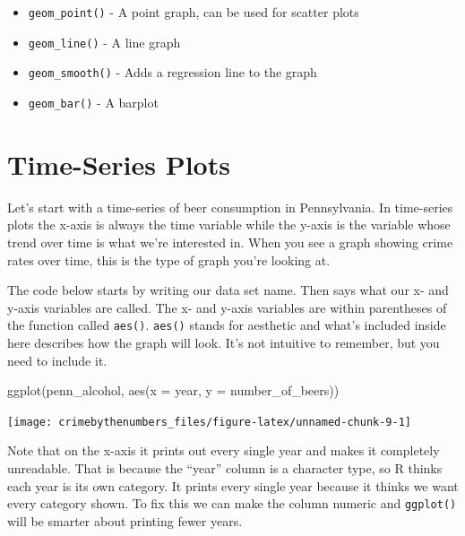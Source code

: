 \documentclass[
]{krantz}
\makeatletter
\newenvironment{Shaded}{\begin{snugshade}}{\end{snugshade}}
\newcommand{\AttributeTok}[1]{\textcolor[rgb]{0.61,0.61,0.61}{#1}}
\newcommand{\FunctionTok}[1]{\textcolor[rgb]{0,0,0}{#1}}
\newcommand{\NormalTok}[1]{#1}
\providecommand{\tightlist}{%
  \setlength{\itemsep}{0pt}\setlength{\parskip}{0pt}}
\newenvironment{kframe}{%
\medskip{}
\setlength{\fboxsep}{.8em}
 \def\at@end@of@kframe{}%
 \ifinner\ifhmode%
  \def\at@end@of@kframe{\end{minipage}}%
  \begin{minipage}{\columnwidth}%
 \fi\fi%
 \def\FrameCommand##1{\hskip\@totalleftmargin \hskip-\fboxsep
 \colorbox{shadecolor}{##1}\hskip-\fboxsep
     \hskip-\linewidth \hskip-\@totalleftmargin \hskip\columnwidth}%
 \MakeFramed {\advance\hsize-\width
   \@totalleftmargin\z@ \linewidth\hsize
   \@setminipage}}%
 {\par\unskip\endMakeFramed%
 \at@end@of@kframe}
\renewenvironment{Shaded}{\begin{kframe}}{\end{kframe}}
\makeatother
\begin{document}
\begin{itemize}
\tightlist
\item
  \texttt{geom\_point()} - A point graph, can be used for scatter plots
\item
  \texttt{geom\_line()} - A line graph
\item
  \texttt{geom\_smooth()} - Adds a regression line to the graph
\item
  \texttt{geom\_bar()} - A barplot
\end{itemize}

\hypertarget{time-series-plots}{%
\section{Time-Series Plots}\label{time-series-plots}}

Let's start with a time-series of beer consumption in Pennsylvania. In time-series plots the x-axis is always the time variable while the y-axis is the variable whose trend over time is what we're interested in. When you see a graph showing crime rates over time, this is the type of graph you're looking at.

The code below starts by writing our data set name. Then says what our x- and y-axis variables are called. The x- and y-axis variables are within parentheses of the function called \texttt{aes()}. \texttt{aes()} stands for aesthetic and what's included inside here describes how the graph will look. It's not intuitive to remember, but you need to include it.

\begin{Shaded}
\begin{Highlighting}[]
\FunctionTok{ggplot}\NormalTok{(penn\_alcohol, }\FunctionTok{aes}\NormalTok{(}\AttributeTok{x =}\NormalTok{ year,}
                         \AttributeTok{y =}\NormalTok{ number\_of\_beers))}
\end{Highlighting}
\end{Shaded}

\begin{center}\texttt{[image: crimebythenumbers\_files/figure-latex/unnamed-chunk-9-1]} \end{center}

Note that on the x-axis it prints out every single year and makes it completely unreadable. That is because the ``year'' column is a character type, so R thinks each year is its own category. It prints every single year because it thinks we want every category shown. To fix this we can make the column numeric and \texttt{ggplot()} will be smarter about printing fewer years.
\end{document}
